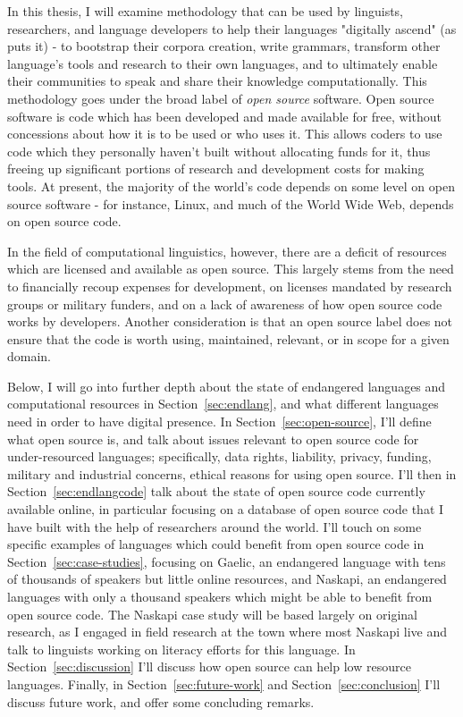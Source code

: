 In this thesis, I will examine methodology that can be used by linguists, researchers, and language developers to help their languages "digitally ascend" (as \citet{kornai2013digital} puts it) - to bootstrap their corpora creation, write grammars, transform other language's tools and research to their own languages, and to ultimately enable their communities to speak and share their knowledge computationally. This methodology goes under the broad label of \textit{open source} software. Open source software is code which has been developed and made available for free, without concessions about how it is to be used or who uses it. This allows coders to use code which they personally haven't built without allocating funds for it, thus freeing up significant portions of research and development costs for making tools. At present, the majority of the world's code depends on some level on open source software - for instance, Linux, and much of the World Wide Web, depends on open source code.

In the field of computational linguistics, however, there are a deficit of resources which are licensed and available as open source. This largely stems from the need to financially recoup expenses for development, on licenses mandated by research groups or military funders, and on a lack of awareness of how open source code works by developers. Another consideration is that an open source label does not ensure that the code is worth using, maintained, relevant, or in scope for a given domain.

Below, I will go into further depth about the state of endangered languages and computational resources in Section~\ref{sec:endlang}, and what different languages need in order to have digital presence. In Section~\ref{sec:open-source}, I'll define what open source is, and talk about issues relevant to open source code for under-resourced languages; specifically, data rights, liability, privacy, funding, military and industrial concerns, ethical reasons for using open source. I'll then in Section~\ref{sec:endlangcode} talk about the state of open source code currently available online, in particular focusing on a database of open source code that I have built with the help of researchers around the world. I'll touch on some specific examples of languages which could benefit from open source code in Section~\ref{sec:case-studies}, focusing on Gaelic, an endangered language with tens of thousands of speakers but little online resources, and Naskapi, an endangered languages with only a thousand speakers which might be able to benefit from open source code. The Naskapi case study will be based largely on original research, as I engaged in field research at the town where most Naskapi live and talk to linguists working on literacy efforts for this language. In Section~\ref{sec:discussion} I'll discuss how open source can help low resource languages. Finally, in Section~\ref{sec:future-work} and Section~\ref{sec:conclusion} I'll discuss future work, and offer some concluding remarks.
